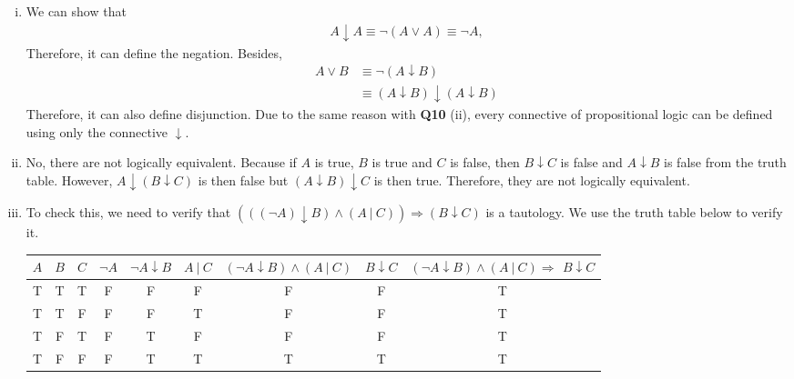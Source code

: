 \documentclass{article}[12pt]
\begin{document}
\begin{enumerate}[(i)]
\item We can show that 
\begin{align*}
A\downarrow A \equiv \neg (A\vee A)\equiv \neg A,
\end{align*}
Therefore, it can define the negation.
Besides, 
\begin{align*}
A\vee B &\equiv \neg (A\downarrow B)\\
&\equiv (A\downarrow B) \downarrow (A\downarrow B)
\end{align*}
Therefore, it can also define disjunction. Due to the same reason with \textbf{Q10} (ii),  every connective of propositional logic can be defined using only the connective $\downarrow$.
\item No, there are not logically equivalent. Because if $A$ is true, $B$ is true and $C$ is false, then $B \downarrow C $ is false and $A \downarrow B $ is false from the truth table. However, $A \downarrow(B \downarrow C)$ is then false but $(A \downarrow B) \downarrow C$ is then true. Therefore, they are not logically equivalent.
\item To check this, we need to verify that $(((\neg A) \downarrow B)\wedge (A\ |\ C))\Longrightarrow (B\downarrow C) $ is a tautology. We use the truth table below to verify it. 
\begin{table}[H]\centering
\begin{tabular}{c|c|c|||c|c||c||c|||c|||c}
$A$ & $B$ & $C$ & $\neg A$ & $\neg A \downarrow B$ & $A\ |\ C$ & $(\neg A \downarrow B)\wedge (A\ |\ C)$ & $B\downarrow C$ & $(\neg A \downarrow B)\wedge (A\ |\ C)\Longrightarrow$ $B\downarrow C$ \\ 
\hline
T   & T   & T   & F        & F                     & F         & F                                       & F               & T                                                                      \\
T   & T   & F   & F        & F                     & T         & F                                       & F               & T                                                                      \\
T   & F   & T   & F        & T                     & F         & F                                       & F               & T                                                                      \\
T   & F   & F   & F        & T                     & T         & T                                       & T               & T                                                                      \\

\end{tabular}
\end{table}
\end{enumerate}
\end{document}

